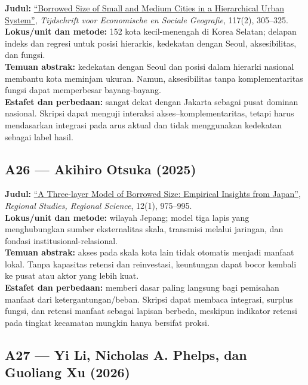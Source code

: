 \documentclass[
  indonesian,
  11pt,
  a4paper,
  oneside,
  openany]{report}
\begin{document}
\textbf{Judul:} \href{https://doi.org/10.1111/tesg.70061}{``Borrowed
Size of Small and Medium Cities in a Hierarchical Urban System''},
\emph{Tijdschrift voor Economische en Sociale Geografie}, 117(2),
305--325.\\
\textbf{Lokus/unit dan metode:} 152 kota kecil-menengah di Korea
Selatan; delapan indeks dan regresi untuk posisi hierarkis, kedekatan
dengan Seoul, aksesibilitas, dan fungsi.\\
\textbf{Temuan abstrak:} kedekatan dengan Seoul dan posisi dalam
hierarki nasional membantu kota meminjam ukuran. Namun, aksesibilitas
tanpa komplementaritas fungsi dapat memperbesar bayang-bayang.\\
\textbf{Estafet dan perbedaan:} sangat dekat dengan Jakarta sebagai
pusat dominan nasional. Skripsi dapat menguji interaksi
akses--komplementaritas, tetapi harus mendasarkan integrasi pada arus
aktual dan tidak menggunakan kedekatan sebagai label hasil.

\subsection{A26 --- Akihiro Otsuka
(2025)}\label{a26-akihiro-otsuka-2025}

\textbf{Judul:} \href{https://doi.org/10.1080/21681376.2025.2590896}{``A
Three-layer Model of Borrowed Size: Empirical Insights from Japan''},
\emph{Regional Studies, Regional Science}, 12(1), 975--995.\\
\textbf{Lokus/unit dan metode:} wilayah Jepang; model tiga lapis yang
menghubungkan sumber eksternalitas skala, transmisi melalui jaringan,
dan fondasi institusional-relasional.\\
\textbf{Temuan abstrak:} akses pada skala kota lain tidak otomatis
menjadi manfaat lokal. Tanpa kapasitas retensi dan reinvestasi,
keuntungan dapat bocor kembali ke pusat atau aktor yang lebih kuat.\\
\textbf{Estafet dan perbedaan:} memberi dasar paling langsung bagi
pemisahan manfaat dari ketergantungan/beban. Skripsi dapat membaca
integrasi, surplus fungsi, dan retensi manfaat sebagai lapisan berbeda,
meskipun indikator retensi pada tingkat kecamatan mungkin hanya bersifat
proksi.

\subsection{A27 --- Yi Li, Nicholas A. Phelps, dan Guoliang Xu
(2026)}\label{a27-yi-li-nicholas-a.-phelps-dan-guoliang-xu-2026}
\end{document}
